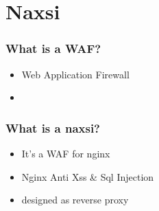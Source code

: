 \section{Naxsi}

\begin{frame}
  \frametitle{What is a WAF?}
   \begin{itemize}
   \item Web Application Firewall 
   \item 
  \end{itemize}
\end{frame}

\begin{frame}
  \frametitle{What is a naxsi?}
   \begin{itemize}
   \item It's a WAF for nginx
   \item Nginx Anti Xss \& Sql Injection
   \item designed as reverse proxy
  \end{itemize}
\end{frame}

